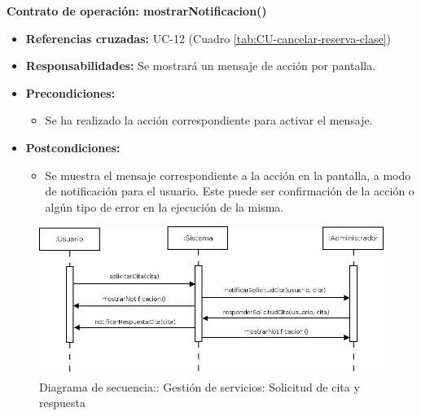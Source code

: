 \textbf{Contrato de operación: mostrarNotificacion()}
\begin{itemize}
\item \textbf{Referencias cruzadas:} UC-12 (Cuadro \ref{tab:CU-cancelar-reserva-clase})
\item \textbf{Responsabilidades:} Se mostrará un mensaje de acción por pantalla.
\item \textbf{Precondiciones:} 
 \begin{itemize}
\item Se ha realizado la acción correspondiente para activar el mensaje.
\end {itemize}
\item \textbf{Postcondiciones:} 
 \begin{itemize}
\item Se muestra el mensaje correspondiente a la acción en la pantalla, a modo de notificación para el usuario. Este puede ser confirmación de la acción o algún tipo de error en la ejecución de la misma.
\end {itemize}
\end {itemize}


\vspace{7mm}
\dotfill
\vspace{7mm}

\begin{figure}[h!]
\centering
  \includegraphics[scale=.45]{img/secuencias/gestion-servicios-solicitar-responder-cita.jpeg}
  \caption{Diagrama de secuencia:: Gestión de servicios: Solicitud de cita y respuesta}
  \label{fig:secuencia-gestion-servicios-solicitar-responder-cita.jpeg}
\end{figure}

